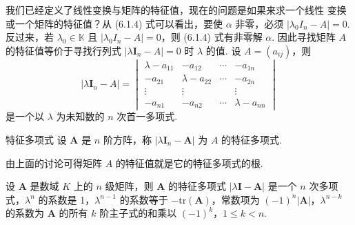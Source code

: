 \documentclass[12pt, a4paper]{ctexart}
\begin{document}
我们已经定义了线性变换与矩阵的特征值，现在的问题是如果来求一个线性
变换或一个矩阵的特征值？从 (6.1.4) 式可以看出，要使 $\alpha$ 非零，必须 $|\lambda_0 I_n - A| = 0$. 
反过来，若 $\lambda_0 \in \mathbb{K}$ 且 $|\lambda_0 I_n - A| = 0$，则 (6.1.4) 式有非零解 $\alpha$. 因此寻找矩阵 $A$ 的特征值等价于寻找行列式 $|\lambda\bm{I}_n - A| = 0$ 时 $\lambda$ 的值. 设 $A = (a_{ij})$，则
\[ |\lambda\bm{I}_n - A| = \begin{vmatrix}
	\lambda - a_{11} & -a_{12} & \cdots & -a_{1n} \\
	-a_{21} & \lambda - a_{22} & \cdots & -a_{2n} \\
	\vdots & \vdots & & \vdots \\
	-a_{n1} & -a_{n2} & \cdots & \lambda - a_{nn}
\end{vmatrix} \tag{6.1.5}
\]
是一个以 $\lambda$ 为未知数的 $n$ 次首一多项式. 
\begin{definition}{特征多项式}{}
	设 $\bm A$ 是 $n$ 阶方阵，称 $|\lambda \bm I_n - \bm A|$ 为 $A$ 的特征多项式. 
\end{definition}
由上面的讨论可得矩阵 $A$ 的特征值就是它的特征多项式的根. 
\begin{proposition}{}{}
	设 $ \bm A $ 是数域 $ K $ 上的 $ n $ 级矩阵，则 $ \bm A $ 的特征多项式 $ |\lambda\bm{I} - \bm A| $ 是一个 $ n $ 次多项式，$ \lambda^n $ 的系数是 1，$ \lambda^{n-1} $ 的系数等于 $ -\text{tr}(\bm A) $，常数项为 $ (-1)^n |\bm A| $，$ \lambda^{n-k} $ 的系数为 $ \bm A $ 的所有 $ k $ 阶主子式的和乘以 $ (-1)^k $，$ 1 \leqslant k < n $. 
\end{proposition}
\end{document}
